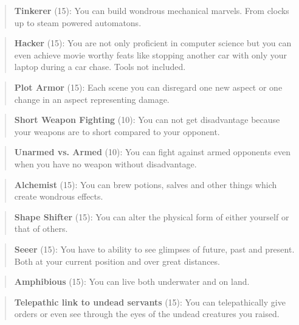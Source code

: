 \documentclass[11pt]{article}
\begin{document}
{\begin{quote}
\textbf{Tinkerer} (15): You can build wondrous mechanical marvels. From clocks up to steam powered automatons. 
\end{quote}

\begin{quote}
\textbf{Hacker} (15): You are not only proficient in computer science but you can even achieve movie worthy feats like stopping another car with only your laptop during a car chase. Tools not included.
\end{quote}

\begin{quote}
\textbf{Plot Armor} (15): Each scene you can disregard one new aspect or one change in an aspect representing damage. 
\end{quote}

\begin{quote}
\textbf{Short Weapon Fighting} (10): You can not get disadvantage because your weapons are to short compared to your opponent.
\end{quote}

\begin{quote}
\textbf{Unarmed vs. Armed} (10): You can fight against armed opponents even when you have no weapon without disadvantage.
\end{quote}

\begin{quote}
\textbf{Alchemist} (15): You can brew potions, salves and other things which create wondrous effects.
\end{quote}

\begin{quote}
\textbf{Shape Shifter} (15): You can alter the physical form of either yourself or that of others.
\end{quote}

\begin{quote}
\textbf{Seeer} (15): You have to ability to see glimpses of future, past and present. Both at your current position and over great distances. 
\end{quote}

\begin{quote}
\textbf{Amphibious} (15): You can live both underwater and on land.
\end{quote}

\begin{quote}
\textbf{Telepathic link to undead servants} (15): You can telepathically give orders or even see through the eyes of the undead creatures you raised. 
\end{quote}
}
\end{document}
